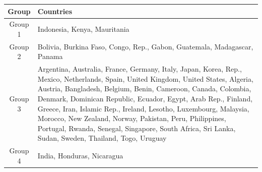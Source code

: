 \begin{tabular}{|c|p{12cm}|}
\toprule
Group & Countries \\
\midrule
Group 1 & Indonesia, Kenya, Mauritania \\
Group 2 & Bolivia, Burkina Faso, Congo, Rep., Gabon, Guatemala, Madagascar, Panama \\
Group 3 & Argentina, Australia, France, Germany, Italy, Japan, Korea, Rep., Mexico, Netherlands, Spain, United Kingdom, United States, Algeria, Austria, Bangladesh, Belgium, Benin, Cameroon, Canada, Colombia, Denmark, Dominican Republic, Ecuador, Egypt, Arab Rep., Finland, Greece, Iran, Islamic Rep., Ireland, Lesotho, Luxembourg, Malaysia, Morocco, New Zealand, Norway, Pakistan, Peru, Philippines, Portugal, Rwanda, Senegal, Singapore, South Africa, Sri Lanka, Sudan, Sweden, Thailand, Togo, Uruguay \\
Group 4 & India, Honduras, Nicaragua \\
\bottomrule
\end{tabular}
